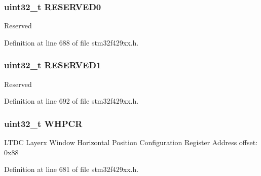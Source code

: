 \subsubsection[{\texorpdfstring{R\+E\+S\+E\+R\+V\+E\+D0}{RESERVED0}}]{\setlength{\rightskip}{0pt plus 5cm}uint32\+\_\+t R\+E\+S\+E\+R\+V\+E\+D0}\hypertarget{struct_l_t_d_c___layer___type_def_af2c92c7cb13569aaff6b4f5a25de5056}{}\label{struct_l_t_d_c___layer___type_def_af2c92c7cb13569aaff6b4f5a25de5056}
Reserved 

Definition at line 688 of file stm32f429xx.\+h.

\subsubsection[{\texorpdfstring{R\+E\+S\+E\+R\+V\+E\+D1}{RESERVED1}}]{\setlength{\rightskip}{0pt plus 5cm}uint32\+\_\+t R\+E\+S\+E\+R\+V\+E\+D1}\hypertarget{struct_l_t_d_c___layer___type_def_a277c51159a2abc260e512496aec82828}{}\label{struct_l_t_d_c___layer___type_def_a277c51159a2abc260e512496aec82828}
Reserved 

Definition at line 692 of file stm32f429xx.\+h.

\subsubsection[{\texorpdfstring{W\+H\+P\+CR}{WHPCR}}]{ uint32\+\_\+t W\+H\+P\+CR}\hypertarget{struct_l_t_d_c___layer___type_def_a36bded5d2b6b499385e45660f4a3c867}{}\label{struct_l_t_d_c___layer___type_def_a36bded5d2b6b499385e45660f4a3c867}
L\+T\+DC Layerx Window Horizontal Position Configuration Register Address offset\+: 0x88 

Definition at line 681 of file stm32f429xx.\+h.

